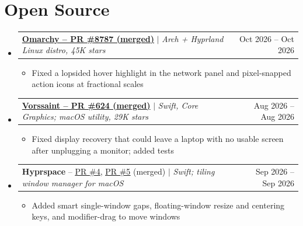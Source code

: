 \documentclass[letterpaper,10pt]{article}
\makeatletter
\newcommand{\resumeItem}[1]{
  \item\small{
    {#1 \vspace{-2pt}}
  }
}
\newcommand{\resumeProjectHeading}[2]{
    \item
    \begin{tabular*}{0.97\textwidth}{l@{\extracolsep{\fill}}r}
      \small#1 & #2 \\
    \end{tabular*}\vspace{-7pt}
}
\newcommand{\resumeItemListStart}{\begin{itemize}[leftmargin=0.15in, label=\textbullet, itemsep=0pt, topsep=2pt]}
\newcommand{\resumeItemListEnd}{\end{itemize}\vspace{-5pt}}
\newcommand{\resumeSubHeadingListStart}{\begin{itemize}[leftmargin=0.15in, label={}]}
\newcommand{\resumeSubHeadingListEnd}{\end{itemize}}
\makeatother
\begin{document}
\section{Open Source}
    \resumeSubHeadingListStart
      \resumeProjectHeading
          {\href{https://github.com/omacom/omarchy/pull/8787}{\textbf{Omarchy -- PR \#8787 (merged)}} $|$ \emph{Arch + Hyprland Linux distro, 45K stars}}{Oct 2026 -- Oct 2026}
          \resumeItemListStart
            \resumeItem{Fixed a lopsided hover highlight in the network panel and pixel-snapped action icons at fractional scales}
          \resumeItemListEnd
      \resumeProjectHeading
          {\href{https://github.com/vorssaint/vorssaint-utils/pull/624}{\textbf{Vorssaint -- PR \#624 (merged)}} $|$ \emph{Swift, Core Graphics; macOS utility, 29K stars}}{Aug 2026 -- Aug 2026}
          \resumeItemListStart
            \resumeItem{Fixed display recovery that could leave a laptop with no usable screen after unplugging a monitor; added tests}
          \resumeItemListEnd
      \resumeProjectHeading
          {\textbf{Hyprspace} -- \href{https://github.com/PeachlifeAB/hyprspace-core/pull/4}{\underline{PR \#4}}, \href{https://github.com/PeachlifeAB/hyprspace-core/pull/5}{\underline{PR \#5}} (merged) $|$ \emph{Swift; tiling window manager for macOS}}{Sep 2026 -- Sep 2026}
          \resumeItemListStart
            \resumeItem{Added smart single-window gaps, floating-window resize and centering keys, and modifier-drag to move windows}
          \resumeItemListEnd
    \resumeSubHeadingListEnd

\end{document}
